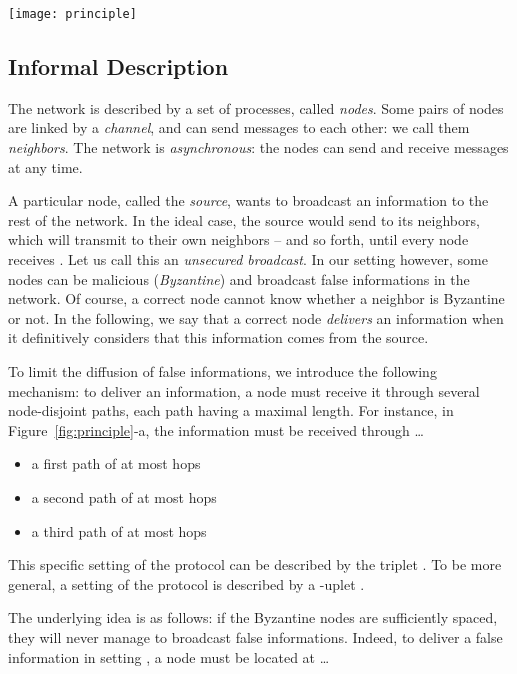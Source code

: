 \documentclass[a4paper,11pt]{article}
\begin{document}
\begin{figure*}
\begin{center}
\texttt{[image: principle]}
\caption{Principle of the protocol} 
\label{fig:principle}
\end{center}
\end{figure*}

\subsection{Informal Description}
\label{informal}

The network is described by a set of processes, called \emph{nodes}. Some pairs of nodes are linked by a \emph{channel}, and can send messages to each other: we call them \emph{neighbors}. The network is \emph{asynchronous}: the nodes can send and receive messages at any time.

A particular node, called the \emph{source}, wants to broadcast an information  to the rest of the network. In the ideal case, the source would send  to its neighbors, which will transmit  to their own neighbors -- and so forth, until every node receives . Let us call this an \emph{unsecured broadcast}. In our setting however, some nodes can be malicious (\emph{Byzantine}) and broadcast false informations in the network. Of course, a correct node cannot know whether a neighbor is Byzantine or not.
In the following, we say that a correct node \emph{delivers} an information when it definitively considers that this information comes from the source.

To limit the diffusion of false informations, we introduce the following mechanism:
to deliver an information, a node must receive it through several node-disjoint paths, each path having a maximal length. For instance, in Figure~\ref{fig:principle}-a, the information must be received through \dots

\begin{itemize}
\item a first path of at most  hops
\item a second path of at most  hops
\item a third path of at most  hops
\end{itemize}

This specific setting of the protocol can be described by the triplet . To be more general, a setting of the protocol is described by a -uplet .

The underlying idea is as follows: if the Byzantine nodes are sufficiently
spaced, they will never manage to broadcast false informations. Indeed, to deliver a false information in setting , a node must be located at \dots
\end{document}
